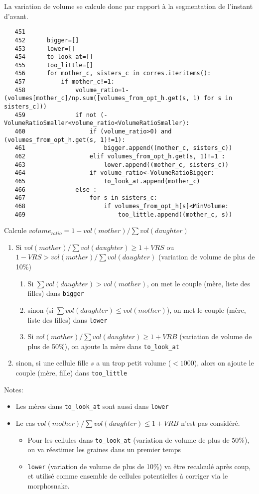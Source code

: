 \documentclass{article}
\def \mycolor {red}
\begin{document}
La variation de volume se calcule donc par rapport \`a la segmentation de l'instant d'avant.
\color{black}
\begin{verbatim} 
   451	
   452	    bigger=[]
   453	    lower=[]
   454	    to_look_at=[]
   455	    too_little=[]
   456	    for mother_c, sisters_c in corres.iteritems():
   457	        if mother_c!=1:
   458	            volume_ratio=1-(volumes[mother_c]/np.sum([volumes_from_opt_h.get(s, 1) for s in sisters_c]))
   459	            if not (-VolumeRatioSmaller<volume_ratio<VolumeRatioSmaller):
   460	                if (volume_ratio>0) and (volumes_from_opt_h.get(s, 1)!=1):
   461	                    bigger.append((mother_c, sisters_c))
   462	                elif volumes_from_opt_h.get(s, 1)!=1 :
   463	                    lower.append((mother_c, sisters_c))
   464	                if volume_ratio<-VolumeRatioBigger:
   465	                    to_look_at.append(mother_c)
   466	            else :
   467	                for s in sisters_c:
   468	                    if volumes_from_opt_h[s]<MinVolume:
   469	                        too_little.append((mother_c, s))
\end{verbatim} 
\color{\mycolor}
Calcule $volume_{ratio} = 1 - vol(mother) / \sum vol(daughter)$
\begin{enumerate}
\itemsep -0.5ex
\item Si $vol(mother) / \sum vol(daughter) \geq 1 + VRS$ ou $1 - VRS > vol(mother) / \sum vol(daughter)$ (variation de volume de plus de 10\%)
\begin{enumerate}
\item Si $\sum vol(daughter) > vol(mother)$, on met le couple (m\`ere, liste des filles) dans \verb|bigger|
\item sinon (si $\sum vol(daughter) \leq vol(mother)$), on met le couple (m\`ere, liste des filles) dans \verb|lower|
\item Si $vol(mother) / \sum vol(daughter) \geq 1 + VRB$ (variation de volume de plus de 50\%), on ajoute la m\`ere dans \verb|to_look_at|
\end{enumerate}
\item sinon, si une cellule fille $s$ a un trop petit volume ($<1000$), alors on ajoute le couple (m\`ere, fille) dans \verb|too_little|
\end{enumerate}
Notes:
\begin{itemize}
\itemsep -0.5ex
\item Les m\`eres dans  \verb|to_look_at| sont aussi dans \verb|lower|
\item Le cas $vol(mother) / \sum vol(daughter) \leq 1 + VRB$ n'est pas consid\'er\'e. 
\begin{itemize}
\item Pour les cellules dans \verb|to_look_at| (variation de volume de plus de 50\%), on va r\'eestimer les graines dans un premier temps
\item \verb|lower| (variation de volume de plus de 10\%) va \^etre recalcul\'e apr\`es coup, et utilis\'e comme ensemble de cellules potentielles \`a corriger via le morphosnake.
\end{itemize}

\end{itemize}
\end{document}
